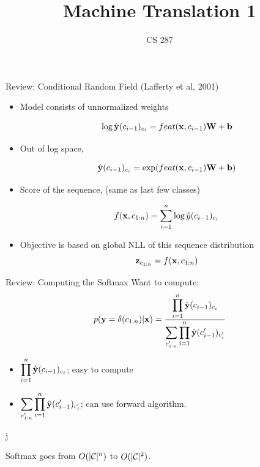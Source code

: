 \documentclass{beamer}
\title{Machine Translation 1}
\date{}
\author{CS 287}
\begin{document}
\begin{frame}
  \titlepage
\end{frame}


\begin{frame}{Review: Conditional Random Field (Lafferty et al, 2001)}
  \begin{itemize}
  \item Model consists of unnormalized weights 

    \[\log \hat{\mathbf{y}}(c_{i-1})_{c_i} = feat(\mathbf{x}, c_{i-1}) \mathbf{W} + \mathbf{b}\]
    
  \item Out of log space, 

    \[ \hat{\mathbf{y}}(c_{i-1})_{c_i} = \exp(feat(\mathbf{x}, c_{i-1}) \mathbf{W} + \mathbf{b})\]

    

  \item Score of the sequence, (same as last few classes)
    
    \[ f(\mathbf{x}, c_{1:n}) = \sum_{i=1}^n \log \hat{y}(c_{i-1})_{c_{i}} \] 

  \item Objective is based on global NLL of this sequence distribution
    \[\mathbf{z}_{c_{1:n}} =  f(\mathbf{x}, c_{1:n})    \] 

  \end{itemize}
\end{frame}

 \begin{frame}{Review: Computing the Softmax}
   Want to compute:
   \[ p(\mathbf{y}=\delta(c_{1:n}) | \mathbf{x}) = \frac{\displaystyle \prod_{i=1}^n \hat{\mathbf{y}}(c_{i-1})_{c_i}} {\displaystyle  \sum_{c'_{1:n}} \prod_{i=1}^n \hat{\mathbf{y}}(c'_{i-1})_{c'_i} }\] 

   \begin{itemize}
   \item $\displaystyle \prod_{i=1}^n \hat{\mathbf{y}}(c_{i-1})_{c_i}$; easy to compute
     \air 
   \item $\displaystyle \sum_{c'_{1:n}} \prod_{i=1}^n \hat{\mathbf{y}}(c'_{i-1})_{c'_i}$; can use forward algorithm.
   \end{itemize}j

   Softmax goes from $O(|\mathcal{C}|^n)$ to $O(|\mathcal{C}|^2)$.  
 \end{frame}
\end{document}
